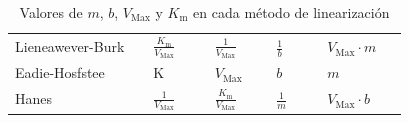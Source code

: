 \begin{table}
\centering

\caption{Valores de $m$, $b$, $V_\text{Max}$ y $K_\text{m}$ en cada método de linearización}
\label{tab:valores_métodos_linearización}

{\small{}

\begin{tabular}{M{0.275\linewidth}M{0.125\linewidth}M{0.125\linewidth}M{0.1\linewidth}M{0.15\linewidth}}\hline

     &  &  &  &  \\ \hline
    
    Lieneawever-Burk & $\frac{K_\text{m}}{V_\text{Max}}$ & $\frac{1}{V_\text{Max}}$          & $\frac{1}{b}$ & $V_\text{Max} \cdot m$   \\
    Eadie-Hosfstee   & K                          & $V_\text{Max}$                    & $b$           & $m$                           \\
    Hanes            & $\frac{1}{V_\text{Max}}$          & $\frac{K_\text{m}}{V_\text{Max}}$ & $\frac{1}{m}$ & $V_\text{Max} \cdot b$ \\
    
    \hline

\end{tabular}}\end{table}